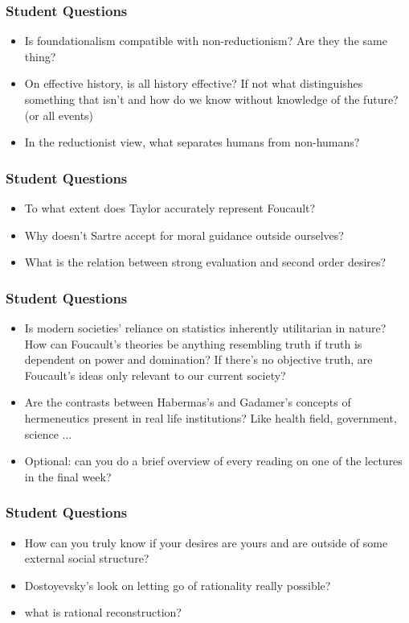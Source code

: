\documentclass[xcolor=dvipsnames]{beamer}
\begin{document}
\begin{frame}
  \frametitle{Student Questions}
  \begin{itemize}
  \item Is foundationalism compatible with non-reductionism? Are they
    the same thing?
  \item On effective history, is all history effective? If not what
    distinguishes something that isn't and how do we know without
    knowledge of the future? (or all events)
  \item In the reductionist view, what separates humans from
    non-humans?
  \end{itemize}
\end{frame}

\begin{frame}
  \frametitle{Student Questions}
  \begin{itemize}
  \item To what extent does Taylor accurately represent Foucault?
  \item Why doesn't Sartre accept for moral guidance outside
    ourselves?
  \item What is the relation between strong evaluation and second
    order desires?
  \end{itemize}
\end{frame}

\begin{frame}
  \frametitle{Student Questions}
  \begin{itemize}
  \item Is modern societies' reliance on statistics inherently
    utilitarian in nature? How can Foucault's theories be anything
    resembling truth if truth is dependent on power and domination? If
    there's no objective truth, are Foucault's ideas only relevant to
    our current society?
  \item Are the contrasts between Habermas's and Gadamer's concepts of
    hermeneutics present in real life institutions? Like health field,
    government, science ...
  \item Optional: can you do a brief overview of every reading on one
    of the lectures in the final week?
  \end{itemize}
\end{frame}

\begin{frame}
  \frametitle{Student Questions}
  \begin{itemize}
  \item How can you truly know if your desires are yours and are
    outside of some external social structure?
  \item Dostoyevsky's look on letting go of rationality really
    possible?
  \item what is rational reconstruction?
  \end{itemize}
\end{frame}
\end{document}
